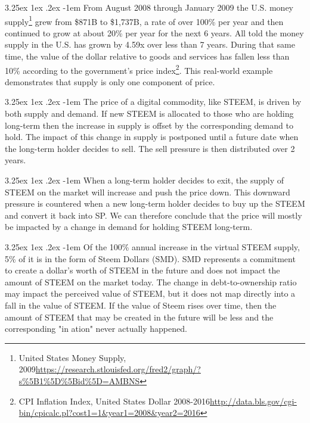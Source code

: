 \documentclass{article}
\makeatletter
\renewcommand\paragraph{\@startsection{paragraph}{5}{\z@}%
  {3.25ex \@plus1ex \@minus.2ex}%
  {-1em}%
  {\normalfont\normalsize\bfseries}}
\makeatother
\begin{document}
			\paragraph{}
				From August 2008 through January 2009 the U.S. money supply\footnote{United States Money Supply, 2009\newline\url{https://research.stlouisfed.org/fred2/graph/?s\%5B1\%5D\%5Bid\%5D=AMBNS}} grew from \$871B to \$1,737B, a rate of over 100\% per year and then continued to grow at about 20\% per year for the next 6 years. All told the money supply in the U.S. has grown by 4.59x over less than 7 years. During that same time, the value of the dollar relative to goods and services has fallen less than 10\% according to the government's price index\footnote{CPI Inflation Index, United States Dollar 2008-2016\newline\url{http://data.bls.gov/cgi-bin/cpicalc.pl?cost1=1&year1=2008&year2=2016}}. This real-world example demonstrates that supply is only one component of price.

			\paragraph{}
				The price of a digital commodity, like STEEM, is driven by both supply and demand. If new STEEM is allocated to those who are holding long-term then the increase in supply is offset by the corresponding demand to hold. The impact of this change in supply is postponed until a future date when the long-term holder decides to sell. The sell pressure is then distributed over 2 years.

			\paragraph{}
				When a long-term holder decides to exit, the supply of STEEM on the market will increase and push the price down. This downward pressure is countered when a new long-term holder decides to buy up the STEEM and convert it back into SP. We can therefore conclude that the price will mostly be impacted by a change in demand for holding STEEM long-term.

			\paragraph{}
				Of the 100\% annual increase in the virtual STEEM supply, 5\% of it is in the form of Steem Dollars (SMD). SMD represents a commitment to create a dollar's worth of STEEM in the future and does not impact the amount of STEEM on the market today. The change in debt-to-ownership ratio may impact the perceived value of STEEM, but it does not map directly into a fall in the value of STEEM. If the value of Steem rises over time, then the amount of STEEM that may be created in the future will be less and the corresponding "in ation" never actually happened.
\end{document}
